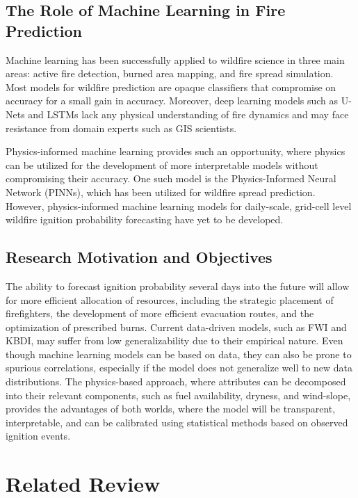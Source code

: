 \documentclass[conference]{IEEEtran}
\begin{document}
\subsection{The Role of Machine Learning in Fire Prediction}

Machine learning has been successfully applied to wildfire science in three main areas: active fire detection, burned area mapping, and fire spread simulation. Most models for wildfire prediction are opaque classifiers that compromise on accuracy for a small gain in accuracy. Moreover, deep learning models such as U-Nets and LSTMs lack any physical understanding of fire dynamics and may face resistance from domain experts such as GIS scientists.

Physics-informed machine learning provides such an opportunity, where physics can be utilized for the development of more interpretable models without compromising their accuracy. One such model is the Physics-Informed Neural Network (PINNs), which has been utilized for wildfire spread prediction. However, physics-informed machine learning models for daily-scale, grid-cell level wildfire ignition probability forecasting have yet to be developed.

\subsection{Research Motivation and Objectives}

The ability to forecast ignition probability several days into the future will allow for more efficient allocation of resources, including the strategic placement of firefighters, the development of more efficient evacuation routes, and the optimization of prescribed burns. Current data-driven models, such as FWI and KBDI, may suffer from low generalizability due to their empirical nature. Even though machine learning models can be based on data, they can also be prone to spurious correlations, especially if the model does not generalize well to new data distributions. The physics-based approach, where attributes can be decomposed into their relevant components, such as fuel availability, dryness, and wind-slope, provides the advantages of both worlds, where the model will be transparent, interpretable, and can be calibrated using statistical methods based on observed ignition events.

\section{Related Review}
\end{document}
